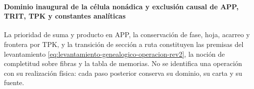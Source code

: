 \paragraph{Dominio inaugural de la célula nonádica y exclusión causal de APP, TRIT, TPK y constantes analíticas}
La prioridad de suma y producto en APP, la conservación de fase, hoja,
acarreo y frontera por TPK, y la transición de sección a ruta constituyen las
premisas del levantamiento
\eqref{eq:levantamiento-genealogico-operacion-rev2}, la noción de completitud
sobre fibras y la tabla de memorias. No se identifica una operación con su realización física:
cada paso posterior conserva su dominio, su carta y su fuente.

